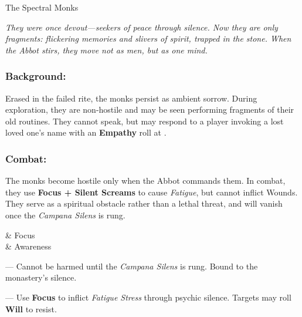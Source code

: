 \documentclass[twocolumn,nodeprecatedcode,bg=print]{dndbook/dndbook}
\begin{document}
\begin{WyrdFullNPC}[%
	name=The Spectral Monks,%
	description=Lingering echoes bound in silence,%
	float=!t%
]{The Spectral Monks}

    \emph{They were once devout—seekers of peace through silence. Now they are only fragments: flickering memories and slivers of spirit, trapped in the stone. When the Abbot stirs, they move not as men, but as one mind.}

    \subsubsection*{Background:}
    Erased in the failed rite, the monks persist as ambient sorrow. During exploration, they are non-hostile and may be seen performing fragments of their old routines. They cannot speak, but may respond to a player invoking a lost loved one’s name with an \textbf{Empathy} roll at \Difficult.

    \subsubsection*{Combat:}
    The monks become hostile only when the Abbot commands them. In combat, they use \textbf{Focus + Silent Screams} to cause \emph{Fatigue}, but cannot inflict Wounds. They serve as a spiritual obstacle rather than a lethal threat, and will vanish once the \emph{Campana Silens} is rung.

    \vspace{0.5\baselineskip}

    \begin{SkillsBox}
        \Skilled & Focus \\
        \Novice & Awareness \\
    \end{SkillsBox}

    \begin{TraitsBox}
        \item[Spectral Silence] — Cannot be harmed until the \emph{Campana Silens} is rung. Bound to the monastery's silence.
        \item[Silent Screams] — Use \textbf{Focus} to inflict \emph{Fatigue Stress} through psychic silence. Targets may roll \textbf{Will} to resist.
    \end{TraitsBox}

    \DamageBox[%
        totalfatigue=3,%
        totalmild=0,%
        totalmoderate=0,%
        totalsevere=0,%
    ]

\end{WyrdFullNPC}
\end{document}

